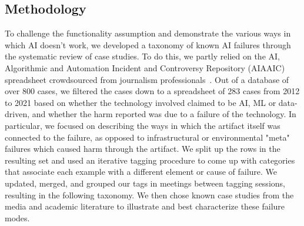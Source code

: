 \documentclass[acmconf,manuscript,screen,natbib=true]{acmart}
\begin{document}
\subsection{Methodology}

To challenge the functionality assumption and demonstrate the various ways in which AI doesn't work, we developed a taxonomy of known AI failures through the systematic review of case studies. %
To do this, we partly relied on the AI, Algorithmic and Automation Incident and Controversy Repository (AIAAIC) spreadsheet crowdsourced from journalism professionals~\cite{AIAAIC}. Out of a database of over 800 cases, we filtered the cases down to a spreadsheet of 283 cases from 2012 to 2021 based on whether the technology involved claimed to be AI, ML or data-driven, and whether the harm reported was due to a failure of the technology. In particular, we focused on describing the ways in which the artifact itself was connected to the failure, as opposed to infrastructural or environmental "meta" failures which caused harm through the artifact. We split up the rows in the resulting set and used an iterative tagging procedure to come up with categories that associate each example with a different element or cause of failure. We updated, merged, and grouped our tags in meetings between tagging sessions, resulting in the following taxonomy. We then chose known case studies from the media and academic literature to illustrate and best characterize these failure modes. %



\end{document}
